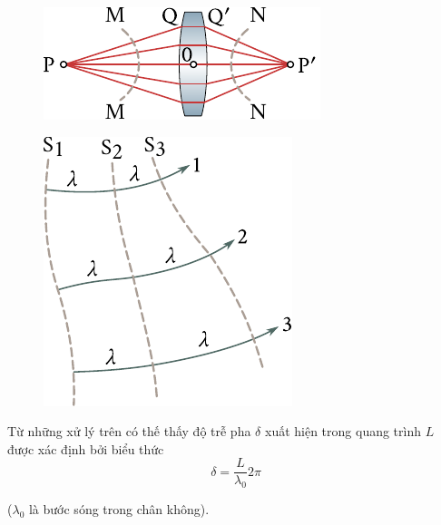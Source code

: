 \begin{figure}[!htb]
	\begin{minipage}[t]{0.48\linewidth}
		\begin{center}
			\includegraphics[scale=1]{figures/ch_16/fig_16_10.pdf}
			\caption[]{}
			\label{fig:16_10}
		\end{center}
	\end{minipage}
	\hfill{ }%
	\begin{minipage}[t]{0.48\linewidth}
		\begin{center}
			\includegraphics[scale=1]{figures/ch_16/fig_16_11.pdf}
            \caption[]{}
			\label{fig:16_11}
		\end{center}
	\end{minipage}
\vspace{-0.4cm}
\end{figure}

Từ những xử lý trên có thế thấy độ trễ pha $\delta$ xuất hiện trong quang trình $L$ được xác định bởi biểu thức
\begin{equation}\label{eq:16_55}
    \delta = \frac{L}{\lambda_0} 2\pi
\end{equation}

\noindent
($\lambda_0$ là bước sóng trong chân không).

